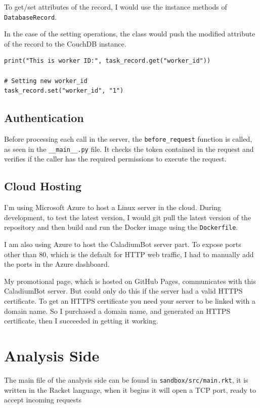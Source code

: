 To get/set attributes of the record,
I would use the instance methods of \texttt{DatabaseRecord}.

In the case of the setting operations,
the  class would push the modified attribute
of the record to the CouchDB instance.

\begin{lstlisting}
print("This is worker ID:", task_record.get("worker_id"))

# Setting new worker_id
task_record.set("worker_id", "1")
\end{lstlisting}

\subsection{Authentication}
Before processing each call in the server,
the \texttt{before\_request} function is called,
as seen in the \texttt{\_\_main\_\_.py} file.
It checks the token contained in the request and
verifies if the caller has the required permissions to execute the request.

\subsection{Cloud Hosting}
I'm using Microsoft Azure to host a Linux server in the cloud.
During development, to test the latest version,
I would git pull the latest version of the repository and
then build and run the Docker image using the \texttt{Dockerfile}.

I am also using Azure to host the CaladiumBot server part.
To expose ports other than 80,
which is the default for HTTP web traffic,
I had to manually add the ports in the Azure dashboard.

My promotional page, which is hosted on GitHub Pages,
communicates with this CaladiumBot server.
But could only do this if the server had a valid HTTPS certificate.
To get an HTTPS certificate you need your server to
be linked with a domain name.
So I purchased a domain name, and generated an HTTPS certificate,
then I succeeded in getting it working.

\section{Analysis Side}
The main file of the analysis side can be found in
\texttt{sandbox/src/main.rkt},
it is written in the Racket language,
when it begins it will open a TCP port,
ready to accept incoming requests

